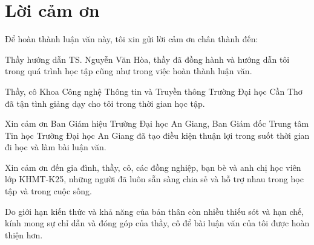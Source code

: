 \chapter*{Lời cảm ơn}
Để hoàn thành luận văn này, tôi xin gửi lời cảm ơn chân thành đến:

Thầy hướng dẫn TS. Nguyễn Văn Hòa, thầy đã đồng hành và hướng dẫn tôi trong quá trình học tập cũng như trong việc hoàn thành luận văn.

Thầy, cô Khoa Công nghệ Thông tin và Truyền thông Trường Đại học Cần Thơ đã tận tình giảng dạy cho tôi trong thời gian học tập.

Xin cảm ơn Ban Giám hiệu Trường Đại học An Giang, Ban Giám đốc Trung tâm Tin học Trường Đại học An Giang đã tạo điều kiện thuận lợi trong suốt thời gian đi học và làm bài luận văn.

Xin cảm ơn đến gia đình, thầy, cô, các đồng nghiệp, bạn bè và anh chị học viên lớp KHMT-K25, những người đã luôn sẵn sàng chia sẻ và hỗ trợ nhau trong học tập và trong cuộc sống.

Do giới hạn kiến thức và khả năng của bản thân còn nhiều thiếu sót và hạn chế, kính mong sự chỉ dẫn và đóng góp của thầy, cô để bài luận văn của tôi được hoàn thiện hơn.